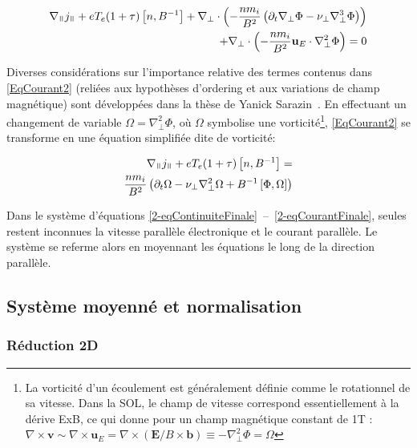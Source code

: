 \begin{refsection}
\begin{equation}\begin{split}
\label{EqCourant2}
\nabla_\para j_\para +
eT_e(1+\tau)\left[n,B\puissance{-1}\right] +
\nabla_\perp\cdot\left(-\frac{nm_{i}}{B^2}\left(\partial_{t}\nabla_\perp \Phi - \nu_\perp \nabla_\perp^3 \Phi \right)\right) \\+
\nabla_\perp\cdot\left(-\frac{nm_{i}}{B^2}\mathbf{u}_E\cdot\nabla_\perp^2
\Phi\right)=0
\end{split}
\end{equation}

Diverses considérations sur l'importance relative des termes contenus dans
\eqref{EqCourant2} (reliées aux hypothèses d'ordering
et aux variations de champ magnétique) sont développées dans la thèse de Yanick
Sarazin~\cite{SarazinPhD}. En effectuant un changement de variable
$\Omega=\nabla_\perp^2\Phi$, où $\Omega$ symbolise une vorticité\footnote{La
vorticité d'un écoulement est généralement définie comme le rotationnel de sa vitesse. Dans la SOL, le champ de vitesse correspond essentiellement à la dérive ExB, ce qui donne pour un champ magnétique constant de 1T : 
$\nabla\times\mathbf{v}\sim\nabla\times\mathbf{u}_E=\nabla\times(\mathbf{E}/B\times\mathbf{b})\equiv-\nabla_\perp^2
\Phi=\Omega$ }, \eqref{EqCourant2} se transforme en une équation simplifiée dite
de vorticité:

\begin{equation}\begin{split}
\label{2-eqCourantFinale}
\nabla_\para{j}_\para +
eT_e(1+\tau)\left[n,B\puissance{-1}\right] =\\
\frac{nm_i}{B^2}\left(\partial_{t}\Omega - \nu_\perp
\nabla_\perp^2\Omega+
B\puissance{-1}\left[\Phi,\Omega\right]\right)
\end{split}
\end{equation} 

 Dans le système d'équations
 \eqref{2-eqContinuiteFinale}~--~\eqref{2-eqCourantFinale}, seules restent
 inconnues la vitesse parallèle électronique  et le courant parallèle. Le
 système se referme alors en moyennant les équations le long de la
 direction parallèle. 

\subsection{Système moyenné et normalisation}
\label{2-flute}
\subsubsection{Réduction 2D}


\end{refsection}
